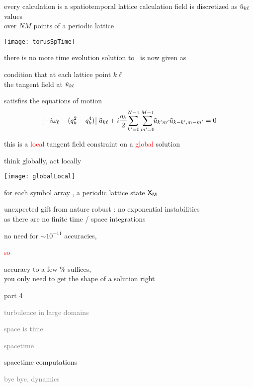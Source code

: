 \begin{frame}{every calculation is a spatiotemporal lattice calculation}
field is discretized as
$\tilde{u}_{k\ell}$ values  \\ over
$N M$ points of a periodic lattice


\begin{center}
\texttt{[image: torusSpTime]}
\end{center}
\end{frame}


\begin{frame}{there is no more time evolution}
solution to \KS\ is now given as
\begin{block}{condition that}
at each lattice point $k\ell$ \\
the tangent field at $\tilde{u}_{k\ell}$
\end{block}
satisfies the equations of motion
\[
\left[- i \omega_\ell - ( q_k^2 - q_k^4 ) \right]\tilde{u}_{k\ell}
+ i \frac{q_k}{2} \!\sum_{k'=0}^{N-1} \sum^{M-1}_{m'=0}\!\!
\tilde{u}_{k'm'} \tilde{u}_{k-k',m-m'}
    =
0
\]

\bigskip

this is a \textcolor{red}{local} tangent field constraint on a
\textcolor{red}{global} solution
\end{frame}

\begin{frame}{think globally, act locally}
    \begin{center}
\texttt{[image: globalLocal]}
    \end{center}
for each symbol array \Mm, a periodic lattice state $\mathsf{X}_{\mathsf{M}}$
\end{frame}

\begin{frame}{unexpected gift from nature}
robust : no exponential instabilities
\\
\hfill as there are no finite time / space integrations
\bigskip

no need for $\sim
10^{-11}$ accuracies,
\bigskip

{\huge \textcolor{red}{so}}
\bigskip

accuracy to a few \% suffices, \\
\hfill you only need to get the shape of a solution right
\end{frame}

\begin{frame}{part 4}
\begin{enumerate}
              \item
    \textcolor{gray}{\small
turbulence in large domains
              \item
space is time
              \item
spacetime    }
              \item {\Large
spacetime computations
    }\textcolor{gray}{\small
              \item
bye bye, dynamics
                    }
            \end{enumerate}
\end{frame}


